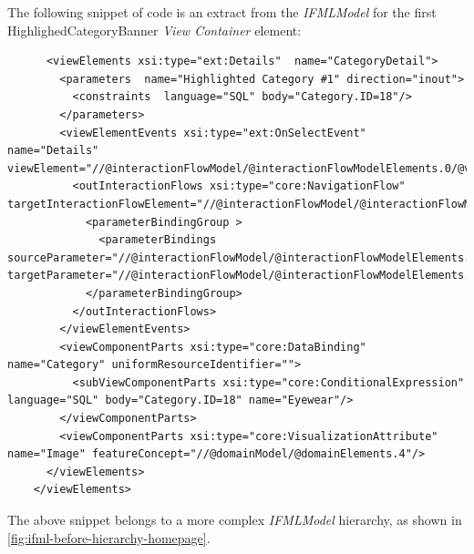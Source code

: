 The following snippet of code is an extract from the \textit{IFMLModel} for the first HighlighedCategoryBanner \textit{View Container} element: 
\vspace{0.5cm}
\lstset{language=XML}
\begin{lstlisting} 
      <viewElements xsi:type="ext:Details"  name="CategoryDetail">
        <parameters  name="Highlighted Category #1" direction="inout">
          <constraints  language="SQL" body="Category.ID=18"/>
        </parameters>
        <viewElementEvents xsi:type="ext:OnSelectEvent"  name="Details" viewElement="//@interactionFlowModel/@interactionFlowModelElements.0/@viewElements.0/@viewElements.0">
          <outInteractionFlows xsi:type="core:NavigationFlow"  targetInteractionFlowElement="//@interactionFlowModel/@interactionFlowModelElements.6">
            <parameterBindingGroup >
              <parameterBindings  sourceParameter="//@interactionFlowModel/@interactionFlowModelElements.0/@viewElements.0/@viewElements.0/@viewElements.0/@parameters.0" targetParameter="//@interactionFlowModel/@interactionFlowModelElements.6/@parameters.0"/>
            </parameterBindingGroup>
          </outInteractionFlows>
        </viewElementEvents>
        <viewComponentParts xsi:type="core:DataBinding"  name="Category" uniformResourceIdentifier="">
          <subViewComponentParts xsi:type="core:ConditionalExpression"  language="SQL" body="Category.ID=18" name="Eyewear"/>
        </viewComponentParts>
        <viewComponentParts xsi:type="core:VisualizationAttribute"  name="Image" featureConcept="//@domainModel/@domainElements.4"/>
      </viewElements>
    </viewElements>
\end{lstlisting}

The above snippet belongs to a more complex \textit{IFMLModel} hierarchy, as shown in \ref{fig:ifml-before-hierarchy-homepage}.


